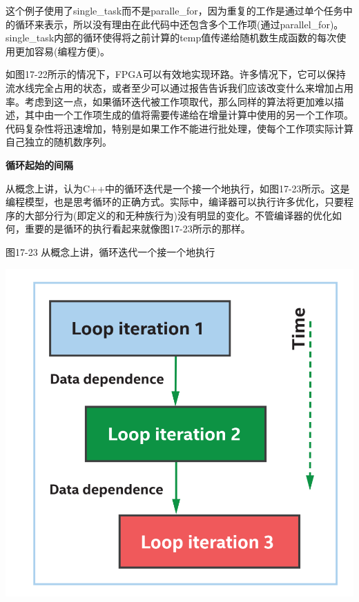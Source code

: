 这个例子使用了single\_task而不是paralle\_for，因为重复的工作是通过单个任务中的循环来表示，所以没有理由在此代码中还包含多个工作项(通过parallel\_for)。single\_task内部的循环使得将之前计算的temp值传递给随机数生成函数的每次使用更加容易(编程方便)。\par

如图17-22所示的情况下，FPGA可以有效地实现环路。许多情况下，它可以保持流水线完全占用的状态，或者至少可以通过报告告诉我们应该改变什么来增加占用率。考虑到这一点，如果循环迭代被工作项取代，那么同样的算法将更加难以描述，其中由一个工作项生成的值将需要传递给在增量计算中使用的另一个工作项。代码复杂性将迅速增加，特别是如果工作不能进行批处理，使每个工作项实际计算自己独立的随机数序列。\par

\hspace*{\fill} \par %
\textbf{循环起始的间隔}

从概念上讲，认为C++中的循环迭代是一个接一个地执行，如图17-23所示。这是编程模型，也是思考循环的正确方式。实际中，编译器可以执行许多优化，只要程序的大部分行为(即定义的和无种族行为)没有明显的变化。不管编译器的优化如何，重要的是循环的执行看起来就像图17-23所示的那样。\par

\hspace*{\fill} \par %
图17-23 从概念上讲，循环迭代一个接一个地执行
\begin{center}
	\includegraphics[width=1.0\textwidth]{content/chapter-17/images/18}
\end{center}

